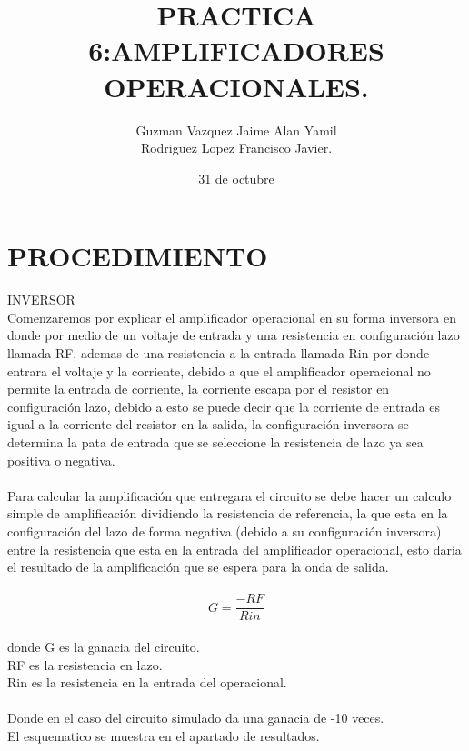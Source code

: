 \documentclass[13pt]{article}
\title{\textbf{PRACTICA 6:AMPLIFICADORES OPERACIONALES.}}
\author{Guzman Vazquez Jaime Alan Yamil\\Rodriguez Lopez Francisco Javier.}
\date{31 de octubre}
\begin{document}
\maketitle

\section{PROCEDIMIENTO}
INVERSOR\\
Comenzaremos por explicar el amplificador operacional en su forma inversora en donde por medio de un voltaje de entrada y una resistencia en configuración lazo llamada RF, ademas de una resistencia a la entrada llamada Rin  por donde entrara el voltaje y la corriente, debido a que el amplificador operacional no permite la entrada de corriente, la corriente  escapa por el resistor en configuración lazo, debido a esto se puede decir que la corriente de entrada es igual a la corriente del resistor en la salida, la configuración inversora se determina la pata de entrada que se seleccione la resistencia de lazo ya sea positiva o negativa.\\\\
Para calcular la amplificación que entregara el circuito se debe hacer un calculo simple de amplificación dividiendo la resistencia de referencia, la que esta en la configuración del lazo de forma negativa (debido a su configuración inversora) entre la resistencia que esta en la entrada del amplificador operacional, esto daría el resultado de la amplificación que se espera para la onda de salida.\\\\

$$G=\frac{-RF}{Rin}$$\\
donde G es la ganacia del circuito.\\
RF es la resistencia en lazo.\\
Rin es la resistencia en la entrada del operacional.
\\\\Donde en el caso del circuito simulado da una ganacia de -10 veces.\\
El esquematico se muestra en el apartado de resultados.\\\\
\end{document}
